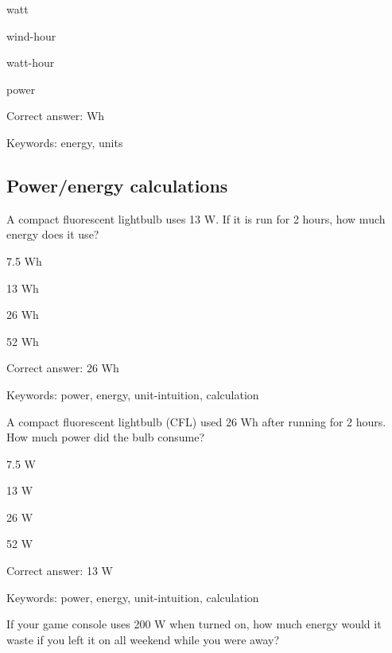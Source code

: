 \begin{answer}
	\item watt
	\item wind-hour
	\item watt-hour
	\item power
\end{answer}

Correct answer: Wh

Keywords: energy, units

\subsection{Power/energy calculations}

\begin{question}
	\item A compact fluorescent lightbulb uses 13 W. If it is run for 2 hours, how much energy does it use?
\end{question}

\begin{answer}
	\item 7.5 Wh
	\item 13 Wh
	\item 26 Wh
	\item 52 Wh
\end{answer}

Correct answer: 26 Wh

Keywords: power, energy, unit-intuition, calculation

\begin{question}
	\item A compact fluorescent lightbulb (CFL) used 26 Wh after running for 2 hours. How much power did the bulb consume?
\end{question}

\begin{answer}
	\item 7.5 W
	\item 13 W
	\item 26 W
	\item 52 W
\end{answer}

Correct answer: 13 W

Keywords: power, energy, unit-intuition, calculation

\begin{question}
	\item If your game console uses 200 W when turned on, how much energy would it waste if you left it on all weekend while you were away?
\end{question}

